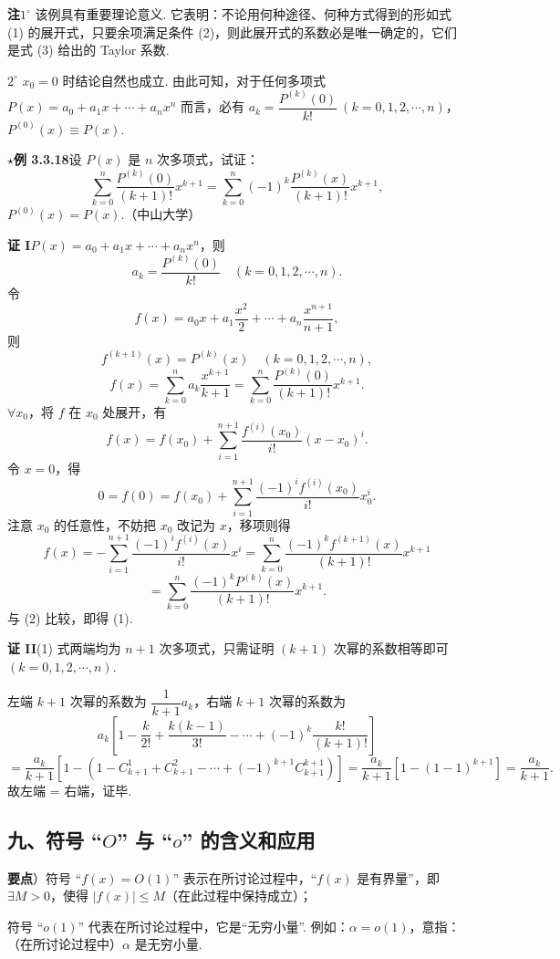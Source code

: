 \documentclass[UTF8,12pt,a4paper,fontset=fandol]{ctexart}
\begin{document}
\noindent\textbf{注}\quad $1^\circ$ 该例具有重要理论意义. 它表明：不论用何种途径、何种方式得到的形如式 (1) 的展开式，只要余项满足条件 (2)，则此展开式的系数必是唯一确定的，它们是式 (3) 给出的 Taylor 系数.

$2^\circ$ $x_0=0$ 时结论自然也成立. 由此可知，对于任何多项式 $P(x)=a_0+a_1x+\cdots+a_nx^n$ 而言，必有 $a_k=\dfrac{P^{(k)}(0)}{k!}\ (k=0,1,2,\cdots,n)$，$P^{(0)}(x)\equiv P(x)$.

\noindent\textbf{$\star$例 3.3.18}\quad 设 $P(x)$ 是 $n$ 次多项式，试证：
\[
  \sum_{k=0}^n\frac{P^{(k)}(0)}{(k+1)!}x^{k+1}
  =\sum_{k=0}^n(-1)^k\frac{P^{(k)}(x)}{(k+1)!}x^{k+1}, \tag{1}
\]
$P^{(0)}(x)=P(x)$.（中山大学）

\noindent\textbf{证 I}\quad $P(x)=a_0+a_1x+\cdots+a_nx^n$，则
\[
  a_k=\frac{P^{(k)}(0)}{k!}\quad(k=0,1,2,\cdots,n).
\]
令
\[
  f(x)=a_0x+a_1\frac{x^2}{2}+\cdots+a_n\frac{x^{n+1}}{n+1},
\]
则
\[
  f^{(k+1)}(x)=P^{(k)}(x)\quad(k=0,1,2,\cdots,n),
\]
\[
  f(x)=\sum_{k=0}^n a_k\frac{x^{k+1}}{k+1}
  =\sum_{k=0}^n\frac{P^{(k)}(0)}{(k+1)!}x^{k+1}. \tag{2}
\]
$\forall x_0$，将 $f$ 在 $x_0$ 处展开，有
\[
  f(x)=f(x_0)+\sum_{i=1}^{n+1}\frac{f^{(i)}(x_0)}{i!}(x-x_0)^i.
\]
令 $x=0$，得
\[
  0=f(0)=f(x_0)+\sum_{i=1}^{n+1}\frac{(-1)^if^{(i)}(x_0)}{i!}x_0^i.
\]
注意 $x_0$ 的任意性，不妨把 $x_0$ 改记为 $x$，移项则得
\[
  f(x)=-\sum_{i=1}^{n+1}\frac{(-1)^if^{(i)}(x)}{i!}x^i
  =\sum_{k=0}^n\frac{(-1)^k f^{(k+1)}(x)}{(k+1)!}x^{k+1}
\]
\[
  =\sum_{k=0}^n\frac{(-1)^kP^{(k)}(x)}{(k+1)!}x^{k+1}.
\]
与 (2) 比较，即得 (1).

\noindent\textbf{证 II}\quad (1) 式两端均为 $n+1$ 次多项式，只需证明 $(k+1)$ 次幂的系数相等即可 $(k=0,1,2,\cdots,n)$.

左端 $k+1$ 次幂的系数为 $\dfrac1{k+1}a_k$，右端 $k+1$ 次幂的系数为
\[
  a_k\left[1-\frac{k}{2!}+\frac{k(k-1)}{3!}-\cdots+(-1)^k\frac{k!}{(k+1)!}\right]
\]
\[
  =\frac{a_k}{k+1}\left[1-\left(1-C_{k+1}^1+C_{k+1}^2-\cdots+(-1)^{k+1}C_{k+1}^{k+1}\right)\right]
  =\frac{a_k}{k+1}\left[1-(1-1)^{k+1}\right]=\frac{a_k}{k+1}.
\]
故左端 = 右端，证毕.

\subsection*{九、符号 ``$O$'' 与 ``$o$'' 的含义和应用}

\noindent\textbf{要点}）符号 ``$f(x)=O(1)$'' 表示在所讨论过程中，``$f(x)$ 是有界量''，即 $\exists M>0$，使得 $|f(x)|\le M$（在此过程中保持成立）；

符号 ``$o(1)$'' 代表在所讨论过程中，它是``无穷小量''. 例如：$\alpha=o(1)$，意指：（在所讨论过程中）$\alpha$ 是无穷小量.
\end{document}
